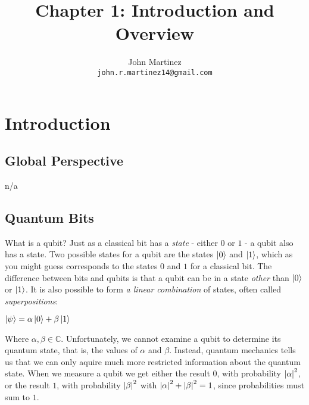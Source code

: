 \documentclass{article}
\title{Chapter 1: Introduction and Overview}
\author{
  John Martinez \\
  \texttt{john.r.martinez14@gmail.com} \\
}
\begin{document}
\maketitle


\section{Introduction}

\subsection{Global Perspective}
n/a

\subsection{Quantum Bits}
What is a qubit? Just as a classical bit has a \emph{state} - either $0$ or $1$
- a qubit also has a state. Two possible states for a qubit are the states
$\ket{0}$ and $\ket{1}$, which as you might guess corresponds to the states
$0$ and $1$ for a classical bit. The difference between bits and qubits is
that a qubit can be in a state \emph{other} than $\ket{0}$ or $\ket{1}$. It
is also possible to form \emph{a linear combination} of states, often
called \emph{superpositions}:

\begin{center}
  $\ket{\psi} = \alpha\ket{0} + \beta\ket{1}$
\end{center}

Where $\alpha, \beta \in \mathbb{C}$.  Unfortunately, we cannot examine a qubit
to determine its quantum state, that is, the values of $\alpha$ and
$\beta$.  Instead, quantum mechanics tells us that we can only aquire
much more restricted information about the quantum state. When we measure a
qubit we get either the result $0$, with probability $\abs{\alpha}^{2}$, or the
result $1$, with probability $\abs{\beta}^{2}$ with
$\abs{\alpha}^{2} + \abs{\beta}^{2} = 1$, since probabilities must sum to $1$.
\end{document}
